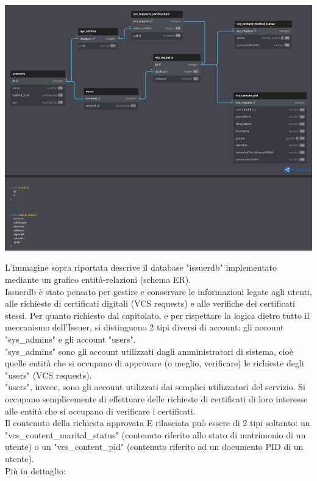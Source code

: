 \begin{center}
    \includegraphics[scale = 0.9]{./res/img/issuerdb.png}
  \end{center}
L'immagine sopra riportata descrive il database "issuerdb" implementato mediante un grafico entità-relazioni (schema ER).\\
Issuerdb è stato pensato per gestire e conservare le informazioni legate agli utenti, alle richieste di certificati digitali (VCS requests) e alle verifiche dei certificati stessi.
Per quanto richiesto dal capitolato, e per rispettare la logica dietro tutto il meccanismo dell'Issuer, si distinguono 2 tipi diversi di account: gli account "sys\_admins" e gli account "users".\\
"sys\_admins" sono gli account utilizzati dagli amministratori di sistema, cioè quelle entità che si occupano di approvare (o meglio, verificare) le richieste degli "users" (VCS requests).\\
"users", invece, sono gli account utilizzati dai semplici utilizzatori del servizio. Si occupano semplicemente di effettuare delle richieste di certificati di loro interesse alle entità che si occupano di verificare i certificati.\\
Il contenuto della richiesta approvata E rilasciata può essere di 2 tipi soltanto: un "vcs\_content\_marital\_status" (contenuto riferito allo stato di matrimonio di un utente) o un "vcs\_content\_pid" (contenuto riferito ad un documento PID di un utente).\\
Più in dettaglio:\\\\
